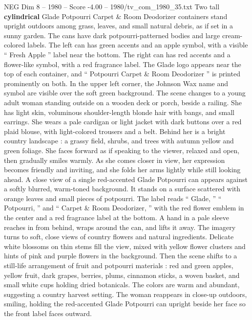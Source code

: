 \begin{textsample}{NEG Dim 8 – 1980 – Score -4.00 – 1980/tv\_com\_1980\_35.txt}  \label{ex:f8_neg_052}
Two tall \textbf{cylindrical} Glade Potpourri Carpet \& Room Deodorizer containers stand upright outdoors among grass, leaves, and small natural debris, as if set in a sunny garden.
The cans have dark potpourri-patterned bodies and large cream-colored labels.
The left can has green accents and an apple symbol, with a visible “ Fresh Apple ” label near the bottom.
The right can has red accents and a flower-like symbol, with a red fragrance label.
The Glade logo appears near the top of each container, and “ Potpourri Carpet \& Room Deodorizer ” is printed prominently on both.
In the upper left corner, the Johnson Wax name and symbol are visible over the soft green background.
The scene changes to a young adult woman standing outside on a wooden deck or porch, beside a railing.
She has light skin, voluminous shoulder-length blonde hair with bangs, and small earrings.
She wears a pale cardigan or light jacket with dark buttons over a red plaid blouse, with light-colored trousers and a belt.
Behind her is a bright country landscape : a grassy field, shrubs, and trees with autumn yellow and green foliage.
She faces forward as if speaking to the viewer, relaxed and open, then gradually smiles warmly.
As she comes closer in view, her expression becomes friendly and inviting, and she folds her arms lightly while still looking ahead.
A close view of a single red-accented Glade Potpourri can appears against a softly blurred, warm-toned background.
It stands on a surface scattered with orange leaves and small pieces of potpourri.
The label reads “ Glade, ” “ Potpourri, ” and “ Carpet \& Room Deodorizer, ” with the red flower emblem in the center and a red fragrance label at the bottom.
A hand in a pale sleeve reaches in from behind, wraps around the can, and lifts it away.
The imagery turns to soft, close views of country flowers and natural ingredients.
Delicate white blossoms on thin stems fill the view, mixed with yellow flower clusters and hints of pink and purple flowers in the background.
Then the scene shifts to a still-life arrangement of fruit and potpourri materials : red and green apples, yellow fruit, dark grapes, berries, plums, cinnamon sticks, a woven basket, and small white cups holding dried botanicals.
The colors are warm and abundant, suggesting a country harvest setting.
The woman reappears in close-up outdoors, smiling, holding the red-accented Glade Potpourri can upright beside her face so the front label faces outward.

\end{textsample}

